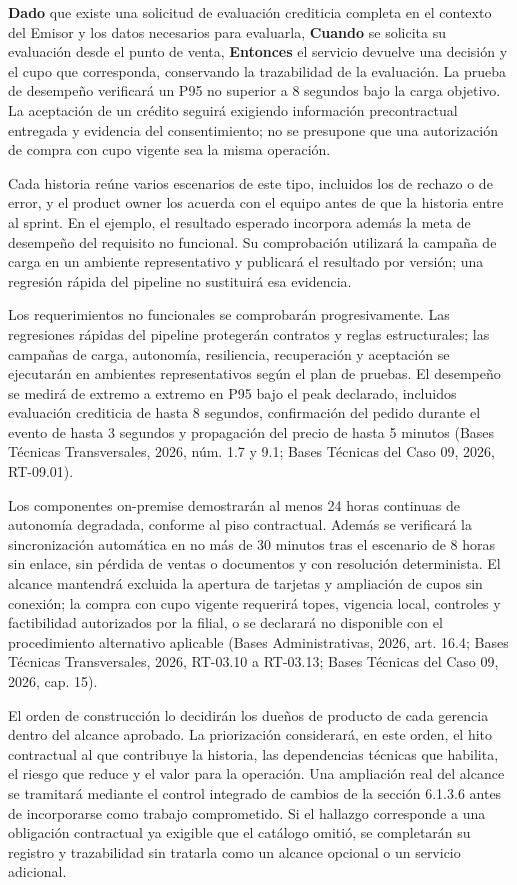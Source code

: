 \documentclass[11pt]{article}
\begin{document}
\textbf{Dado} que existe una solicitud de evaluación crediticia completa en el
contexto del Emisor y los datos necesarios para evaluarla,
\textbf{Cuando} se solicita su evaluación desde el punto de venta,
\textbf{Entonces} el servicio devuelve una decisión y el cupo que
corresponda, conservando la trazabilidad de la evaluación. La prueba de
desempeño verificará un P95 no superior a 8 segundos bajo la carga
objetivo. La aceptación de un crédito seguirá exigiendo información
precontractual entregada y evidencia del consentimiento; no se presupone
que una autorización de compra con cupo vigente sea la misma operación.

Cada historia reúne varios escenarios de este tipo, incluidos los de
rechazo o de error, y el product owner los acuerda con el equipo antes
de que la historia entre al sprint. En el ejemplo, el resultado esperado
incorpora además la meta de desempeño del requisito no funcional. Su
comprobación utilizará la campaña de carga en un ambiente representativo
y publicará el resultado por versión; una regresión rápida del pipeline
no sustituirá esa evidencia.

Los requerimientos no funcionales se comprobarán progresivamente. Las
regresiones rápidas del pipeline protegerán contratos y reglas
estructurales; las campañas de carga, autonomía, resiliencia,
recuperación y aceptación se ejecutarán en ambientes representativos
según el plan de pruebas. El desempeño se medirá de extremo a extremo en
P95 bajo el peak declarado, incluidos evaluación crediticia de hasta 8
segundos, confirmación del pedido durante el evento de hasta 3 segundos
y propagación del precio de hasta 5 minutos (Bases Técnicas
Transversales, 2026, núm. 1.7 y 9.1; Bases Técnicas del Caso 09, 2026,
RT-09.01).

Los componentes on-premise demostrarán al menos 24 horas continuas de
autonomía degradada, conforme al piso contractual. Además se verificará
la sincronización automática en no más de 30 minutos tras el escenario
de 8 horas sin enlace, sin pérdida de ventas o documentos y con
resolución determinista. El alcance mantendrá excluida la apertura de
tarjetas y ampliación de cupos sin conexión; la compra con cupo vigente
requerirá topes, vigencia local, controles y factibilidad autorizados
por la filial, o se declarará no disponible con el procedimiento
alternativo aplicable (Bases Administrativas, 2026, art. 16.4; Bases
Técnicas Transversales, 2026, RT-03.10 a RT-03.13; Bases Técnicas del
Caso 09, 2026, cap. 15).

El orden de construcción lo decidirán los dueños de producto de cada
gerencia dentro del alcance aprobado. La priorización considerará, en
este orden, el hito contractual al que contribuye la historia, las
dependencias técnicas que habilita, el riesgo que reduce y el valor para
la operación. Una ampliación real del alcance se tramitará mediante el
control integrado de cambios de la sección 6.1.3.6 antes de incorporarse
como trabajo comprometido. Si el hallazgo corresponde a una obligación
contractual ya exigible que el catálogo omitió, se completarán su
registro y trazabilidad sin tratarla como un alcance opcional o un
servicio adicional.
\end{document}
